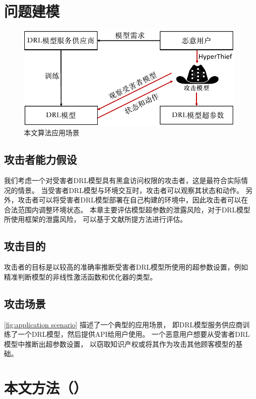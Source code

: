 \section{问题建模}
\label{sec:overview}

\begin{figure}[!ht]
    \center
    \includegraphics[width=0.6\hsize]{figure/drl_hypertheif/fig-drl-systemch.pdf}
    \caption{本文算法应用场景}
    \label{fig:application scenario}
\end{figure}
\subsection{攻击者能力假设}
我们考虑一个对受害者DRL模型具有黑盒访问权限的攻击者，这是最符合实际情况的情景。
当受害者DRL模型与环境交互时，攻击者可以观察其状态和动作。
另外，攻击者可以将受害者DRL模型部署在自己构建的环境中，因此攻击者可以在合法范围内调整环境状态。
本章主要评估模型超参数的泄露风险，对于DRL模型所使用框架的泄露风险，
可以基于文献{\rm\parencite{CGZXL21}}所提方法进行评估。

\subsection{攻击目的}
攻击者的目标是以较高的准确率推断受害者DRL模型所使用的超参数设置，例如精准判断模型的非线性激活函数和优化器的类型。

\subsection{攻击场景}
\autoref{fig:application scenario} 描述了一个典型的应用场景，
即DRL模型服务供应商训练了一个DRL模型，然后提供API给用户使用。
一个恶意用户想要从受害者DRL模型中推断出超参数设置，
以窃取知识产权或将其作为攻击其他顾客模型的基础。


\section{本文方法（\sysname）}
